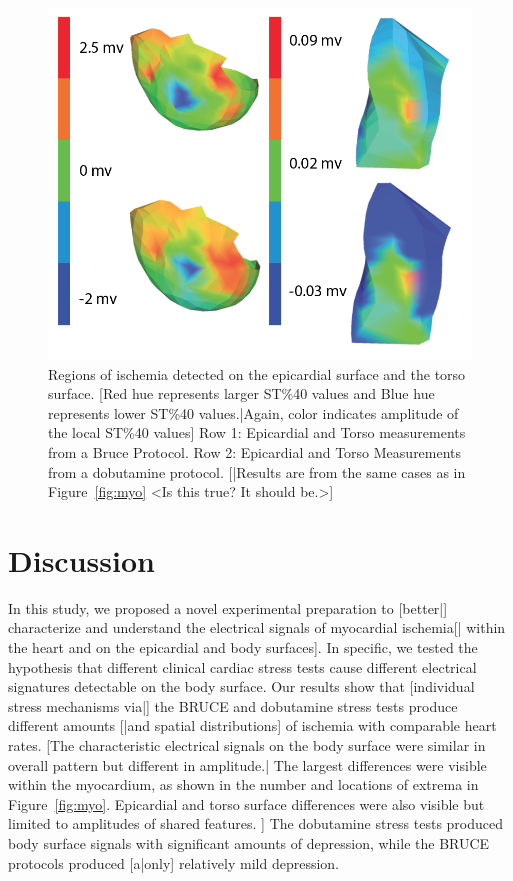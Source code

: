 \documentclass[twocolumn]{cinc}
\begin{document}
\begin{figure}
	\centering
	\includegraphics[width = .45\textwidth]{../Figures/2.png}

	\caption{Regions of ischemia detected on the epicardial surface and
          the torso surface. [Red hue represents larger ST\%40 values and
          Blue hue represents lower ST\%40 values.|Again, color indicates
          amplitude of the local ST\%40 values] Row 1: Epicardial and
          Torso measurements from a Bruce Protocol. Row 2: Epicardial and
          Torso Measurements from a dobutamine protocol.  [|Results are
          from the same cases as in Figure~\ref{fig:myo} <Is this true?  It
          should be.>] }
	\label{fig:epitorso}
\end{figure}

\section{Discussion}

In this study, we proposed a novel experimental preparation to [better|]
characterize and understand the electrical signals of myocardial ischemia[|
within the heart and on the epicardial and body surfaces]. In specific, we
tested the hypothesis that different clinical cardiac stress tests cause
different electrical signatures detectable on the body surface. Our results
show that [individual stress mechanisms via|] the BRUCE and dobutamine
stress tests produce different amounts [|and spatial distributions] of
ischemia with comparable heart rates. [The characteristic electrical
signals on the body surface were similar in overall pattern but different
in amplitude.| The largest differences were visible within the myocardium,
as shown in the number and locations of extrema in Figure~\ref{fig:myo}.
Epicardial and torso surface differences were also visible but limited to
amplitudes of shared features. ] The dobutamine stress tests produced body
surface signals with significant amounts of depression, while the BRUCE
protocols produced [a|only] relatively mild depression.
\end{document}
